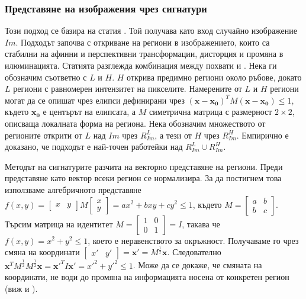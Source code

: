 \documentclass[a4paper,12pt]{article}
\begin{document}
\subsubsection{Представяне на изображения чрез сигнатури}

Този подход се базира на статия \cite{spinimages}. Той получава като вход случайно изображение $Im$. Подходът започва с откриване на региони в изображението, които са стабилни на афинни и перспективни трансформации, дисторция и промяна в илюминацията. Статията разглежда комбинация между похвати \cite{shapeadaptedsmoothingfor3dcues} и \cite{affineinvariantipdetector}. Нека ги обозначим съответно с $L$ и $H$. $H$ открива предимно региони около ръбове, докато $L$ региони с равномерен интензитет на пикселите. Намерените от $L$ и $H$ региони могат да се опишат чрез елипси дефинирани чрез $(\mathbf{x}-\mathbf{x_0})^T M (\mathbf{x}-\mathbf{x_0}) \leq 1$, където $\mathbf{x_0}$ е центърът на елипсата, а $M$ симетрична матрица с размерност $2\times2$, описваща локалната форма на региона. Нека обозначим множеството от регионите открити от $L$ над $Im$ чрез $R_{Im}^L$, а тези от $H$ чрез $R_{Im}^H$. Емпирично е доказано, че подходът е най-точен работейки над $R_{Im}^L \cup R_{Im}^H$.

\bigbreak

Методът на сигнатурите разчита на векторно представяне на региони. Преди представяне като вектор всеки регион се нормализира. За да постигнем това използваме алгебричното представяне $f(x,y) = \begin{bmatrix} x & y \end{bmatrix} M \begin{bmatrix} x\\ y \end{bmatrix} = ax^2 + bxy + cy^2 \leq 1$, където $M=\begin{bmatrix} a & b\\ b & c \end{bmatrix}$. Търсим матрица на идентитет $M = \begin{bmatrix} 1 & 0\\ 0 & 1 \end{bmatrix} = I$, такава че $f(x, y) = x^2 + y^2 \leq 1$, което е неравенството за окръжност. Получаваме го чрез смяна на координати $\begin{bmatrix} x' & y' \end{bmatrix} = \mathbf{x'} = M^{\frac{1}{2}} \mathbf{x}$. Следователно $\mathbf{x}^T M^{\frac{1}{2}} M^{\frac{1}{2}} \mathbf{x} = \mathbf{x'}^T I \mathbf{x'} = x'^2 + y'^2 \leq 1$. Може да се докаже, че смяната на координати, не води до промяна на информацията носена от конкретен регион (виж \cite{shapeadaptedsmoothingfor3dcues} и \cite{affineinvariantipdetector}).
\end{document}
